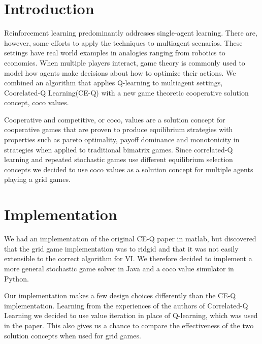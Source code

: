 
\section{Introduction}
\nocite{*}

\hspace{5mm}Reinforcement learning predominantly addresses single-agent learning. There are, however, some efforts to apply the techniques to multiagent scenarios. These settings have real world examples in analogies ranging from robotics to economics. When multiple players interact, game theory is commonly used to model how agents make decisions about how to optimize their actions. We combined an algorithm that applies Q-learning to multiagent settings, Coorelated-Q Learning\cite{Greenwald03correlated-qlearning}(CE-Q) with a new game theoretic cooperative solution concept, coco values\cite{Kalai_acooperative}.

Cooperative and competitive, or coco, values \cite{Kalai:2011:CTP:1978721.1978725, Kalai:2010:CCS:1807342.1807397, Kalai_acooperative} are a solution concept for cooperative games that are proven to produce equilibrium strategies with properties such as pareto optimality, payoff dominance and monotonicity in strategies when applied to traditional bimatrix games. Since correlated-Q learning\cite{Greenwald03correlated-qlearning} and repeated stochastic games\cite{DBLP:journals/corr/abs-1206-3277} use different equilibrium selection concepts we decided to use coco values as a solution concept for multiple agents playing a grid games. 

\section{Implementation}
\hspace{5mm}We had an implementation of the original CE-Q paper in matlab, but discovered that the grid game implementation was to ridgid and that it was not easily extensible to the correct algorithm for VI. We therefore decided to implement a more general stochastic game solver in Java and a coco value simulator in Python. 

\hspace{5mm}Our implementation makes a few design choices differently than the CE-Q implementation. Learning from the experiences of the authors of Correlated-Q Learning we decided to use value iteration in place of Q-learning, which was used in the paper. This also gives us a chance to compare the effectiveness of the two solution concepts when used for grid games.

